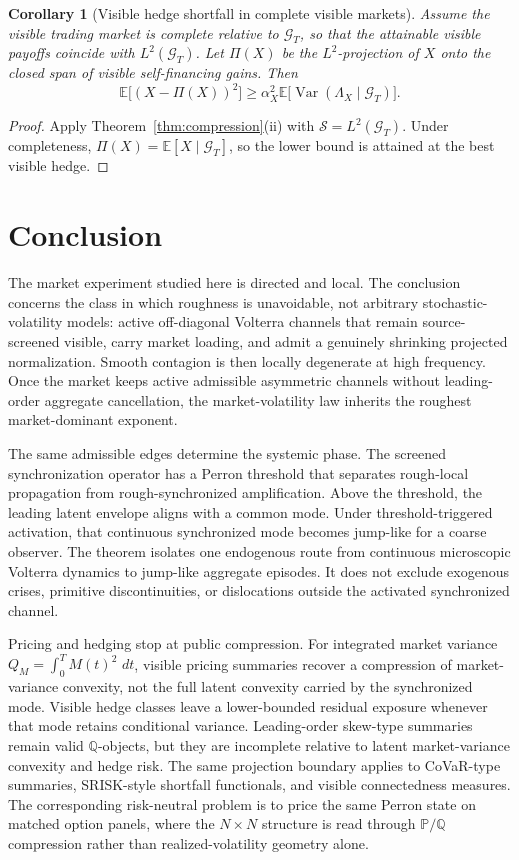 \documentclass[11pt,a4paper]{amsart}
\theoremstyle{plain}
\newtheorem{corollary}[theorem]{Corollary}
\theoremstyle{definition}
\theoremstyle{remark}
\DeclareMathOperator{\Var}{Var}
\newcommand{\PP}{\mathbb{P}}
\newcommand{\QQ}{\mathbb{Q}}
\newcommand{\EE}{\mathbb{E}}
\newcommand{\dd}{\,d}
\newcommand{\cG}{\mathcal{G}}
\begin{document}
\begin{corollary}[Visible hedge shortfall in complete visible markets]
Assume the visible trading market is complete relative to \(\cG_T\), so that the attainable visible
payoffs coincide with \(L^2(\cG_T)\).  Let \(\Pi(X)\) be the \(L^2\)-projection of \(X\) onto the
closed span of visible self-financing gains.  Then
\[
        \EE\bigl[(X-\Pi(X))^2\bigr]
        \ge
        \alpha_X^2
        \EE\bigl[\Var(\Lambda_X\mid \cG_T)\bigr].
\]
\end{corollary}

\begin{proof}
Apply Theorem~\ref{thm:compression}(ii) with \(\mathcal S=L^2(\cG_T)\).  Under completeness,
\(\Pi(X)=\EE[X\mid\cG_T]\), so the lower bound is attained at the best visible hedge.
\end{proof}

\section{Conclusion}\label{sec:conclusion}
The market experiment studied here is directed and local.  The conclusion concerns the class in
which roughness is unavoidable, not arbitrary stochastic-volatility models:
active off-diagonal Volterra channels that remain source-screened visible, carry market loading, and
admit a genuinely shrinking projected normalization.  Smooth contagion is then locally degenerate at
high frequency.  Once the market keeps active admissible asymmetric channels without leading-order
aggregate cancellation, the market-volatility law inherits the roughest market-dominant exponent.

The same admissible edges determine the systemic phase.  The screened synchronization operator has a
Perron threshold that separates rough-local propagation from rough-synchronized amplification.
Above the threshold, the leading latent envelope aligns with a common mode.  Under
threshold-triggered activation, that continuous synchronized mode becomes jump-like for a coarse
observer.  The theorem isolates one endogenous route from continuous microscopic Volterra dynamics
to jump-like aggregate episodes.  It does not exclude exogenous crises, primitive discontinuities,
or dislocations outside the activated synchronized channel.

Pricing and hedging stop at public compression.  For integrated market variance
\(Q_M=\int_0^T M(t)^2\,\dd t\), visible pricing summaries recover a compression of market-variance
convexity, not the full latent convexity carried by the synchronized mode.  Visible hedge classes
leave a lower-bounded residual exposure whenever that mode retains conditional variance.  Leading-order
skew-type summaries remain valid \(\QQ\)-objects, but they are incomplete relative to latent
market-variance convexity and hedge risk.  The same projection boundary applies to CoVaR-type
summaries, SRISK-style shortfall functionals, and visible connectedness measures.  The corresponding
risk-neutral problem is to price the same Perron state on matched option panels, where the
\(N\times N\) structure is read through \(\PP/\QQ\) compression rather than realized-volatility
geometry alone.
\end{document}
